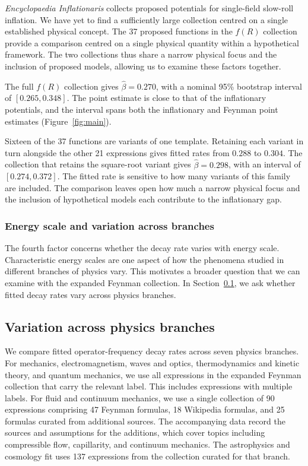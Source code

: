 \documentclass[10pt]{article}
\begin{document}
\textit{Encyclopaedia Inflationaris} collects proposed potentials for single-field slow-roll inflation. We have yet to find a sufficiently large collection centred on a single established physical concept. The 37 proposed functions in the $f(R)$ collection provide a comparison centred on a single physical quantity within a hypothetical framework. The two collections thus share a narrow physical focus and the inclusion of proposed models, allowing us to examine these factors together.

The full $f(R)$ collection gives $\hat{\beta}=0.270$, with a nominal 95\% bootstrap interval of $[0.265,0.348]$. The point estimate is close to that of the inflationary potentials, and the interval spans both the inflationary and Feynman point estimates (Figure~\ref{fig:main}).

Sixteen of the 37 functions are variants of one template. Retaining each variant in turn alongside the other 21 expressions gives fitted rates from $0.288$ to $0.304$. The collection that retains the square-root variant gives $\hat{\beta}=0.298$, with an interval of $[0.274,0.372]$. The fitted rate is sensitive to how many variants of this family are included. The comparison leaves open how much a narrow physical focus and the inclusion of hypothetical models each contribute to the inflationary gap.

\subsubsection{Energy scale and variation across branches}

The fourth factor concerns whether the decay rate varies with energy scale. Characteristic energy scales are one aspect of how the phenomena studied in different branches of physics vary. This motivates a broader question that we can examine with the expanded Feynman collection. In Section~\ref{sec:results}, we ask whether fitted decay rates vary across physics branches.

\subsection{Variation across physics branches}\label{sec:results}

We compare fitted operator-frequency decay rates across seven physics branches. For mechanics, electromagnetism, waves and optics, thermodynamics and kinetic theory, and quantum mechanics, we use all expressions in the expanded Feynman collection that carry the relevant label. This includes expressions with multiple labels. For fluid and continuum mechanics, we use a single collection of 90 expressions comprising 47 Feynman formulas, 18 Wikipedia formulas, and 25 formulas curated from additional sources. The accompanying data record the sources and assumptions for the additions, which cover topics including compressible flow, capillarity, and continuum mechanics. The astrophysics and cosmology fit uses 137 expressions from the collection curated for that branch.
\end{document}
